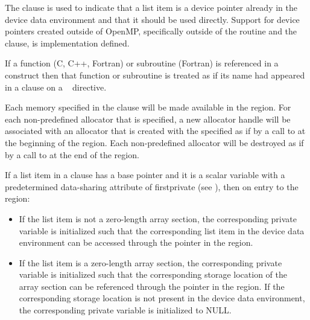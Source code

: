 The  clause is used to indicate that a list item is a device
pointer already in the device data environment and that it should be used
directly.  Support for device pointers created outside of OpenMP, specifically
outside of the  routine and the  clause,
is implementation defined.

If a function (C, C++, Fortran) or subroutine (Fortran) is referenced in a
 construct then that function or subroutine is treated as if its
name had appeared in a  clause on a ~
directive.

Each memory  specified in the  clause will 
be made available in the  region. For each non-predefined allocator 
that is specified, a new allocator handle will be associated with an allocator 
that is created with the specified  as if by a call to 
 at the beginning of the  region. Each 
non-predefined allocator will be destroyed as if by a call to 
 at the end of the  region.

\begin{ccppspecific}

If a list item in a  clause has a base pointer and it is a
scalar variable with a predetermined data-sharing attribute of firstprivate
(see ), then on entry to the  region:

\begin{itemize}
\item If the list item is not a zero-length array section, the corresponding
private variable is initialized such that the corresponding list item in the
device data environment can be accessed through the pointer in the
 region.

\item If the list item is a zero-length array section, the corresponding
private variable is initialized such that the corresponding storage location
of the array section can be referenced through the pointer in the 
region. If the corresponding storage location is not present in the device
data environment, the corresponding private variable is initialized to NULL.
\end{itemize}

\end{ccppspecific}

